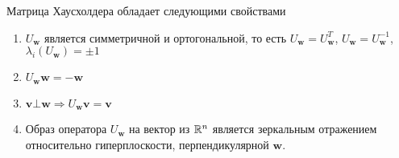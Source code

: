 \begin{theorem}
  Матрица Хаусхолдера обладает следующими свойствами
  \begin{enumerate}
    \item  $U_\mathbf{w}$ является симметричной и ортогональной, то есть $U_\mathbf{w}=U_\mathbf{w}^T$, $U_\mathbf{w}=U_\mathbf{w}^{-1}$, $\lambda_i(U_\mathbf{w})=\pm1$
    \item  $U_\mathbf{w}\mathbf{w}=-\mathbf{w}$
    \item  $\mathbf{v}\bot \mathbf{w}\Rightarrow U_\mathbf{w}\mathbf{v}=\mathbf{v}$
    \item  Образ оператора $U_\mathbf{w}$ на вектор из $\mathbb{R}^n$ является
          зеркальным отражением относительно гиперплоскости, перпендикулярной $\mathbf{w}$.
  \end{enumerate}
\end{theorem}
